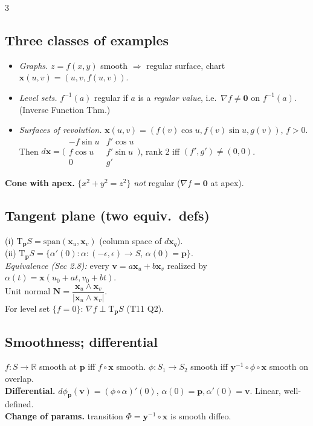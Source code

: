 \documentclass[9pt,a4paper]{extarticle}
\newcommand{\thm}[1]{\textbf{#1.}}
\newcommand{\R}{\mathbb{R}}
\newcommand{\T}{\mathrm{T}}
\newcommand{\N}{\mathbf{N}}
\newcommand{\bx}{\mathbf{x}}
\newcommand{\by}{\mathbf{y}}
\newcommand{\bp}{\mathbf{p}}
\newcommand{\bv}{\mathbf{v}}
\newcommand{\xu}{\bx_u}
\newcommand{\xv}{\bx_v}
\begin{document}
\begin{multicols*}{3}
\subsection{Three classes of examples}
\begin{itemize}
\item \emph{Graphs.} $z=f(x,y)$ smooth $\Rightarrow$ regular surface, chart $\bx(u,v)=(u,v,f(u,v))$.
\item \emph{Level sets.} $f^{-1}(a)$ regular if $a$ is a \emph{regular value}, i.e.\ $\nabla f\ne\mathbf{0}$ on $f^{-1}(a)$. (Inverse Function Thm.)
\item \emph{Surfaces of revolution.} $\bx(u,v)=(f(v)\cos u,f(v)\sin u,g(v))$, $f>0$. Then $d\bx=\!\bigl(\!\begin{smallmatrix}-f\sin u & f'\cos u\\ f\cos u & f'\sin u\\ 0 & g'\end{smallmatrix}\!\bigr)$, rank 2 iff $(f',g')\ne(0,0)$.
\end{itemize}
\thm{Cone with apex} $\{x^2+y^2=z^2\}$ \emph{not} regular ($\nabla f=\mathbf{0}$ at apex).

\subsection{Tangent plane (two equiv.\ defs)}
(i) $\T_\bp S=\mathrm{span}(\xu,\xv)$ (column space of $d\bx_q$).\\
(ii) $\T_\bp S=\{\alpha'(0):\alpha\!:(-\epsilon,\epsilon)\!\to\! S,\,\alpha(0)\!=\!\bp\}$.\\
\emph{Equivalence (Sec 2.8):} every $\bv=a\xu+b\xv$ realized by $\alpha(t)=\bx(u_0+at,v_0+bt)$.\\
Unit normal $\N=\dfrac{\xu\wedge\xv}{|\xu\wedge\xv|}$.\\
For level set $\{f=0\}$: $\nabla f\perp\T_\bp S$ (T11 Q2).

\subsection{Smoothness; differential}
$f\!:\!S\!\to\!\R$ smooth at $\bp$ iff $f\!\circ\!\bx$ smooth.
$\phi\!:\!S_1\!\to\!S_2$ smooth iff $\by^{-1}\!\circ\phi\circ\bx$ smooth on overlap.\\
\thm{Differential} $d\phi_\bp(\bv)=(\phi\circ\alpha)'(0)$, $\alpha(0)=\bp,\alpha'(0)=\bv$. Linear, well-defined.\\
\thm{Change of params} transition $\Phi=\by^{-1}\!\circ\bx$ is smooth diffeo.


\end{multicols*}
\end{document}
